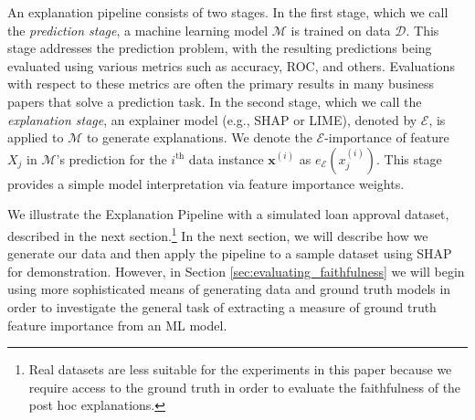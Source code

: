 \documentclass[mnsc,blindrev]{informs3}
\begin{document}
An explanation pipeline consists of two stages. In the first stage, which we call the \emph{prediction stage}, a machine learning model $\mathcal{M}$ is trained on data $\mathcal{D}$. This stage addresses the prediction problem, with the resulting predictions being evaluated using various metrics such as accuracy, ROC, and others. Evaluations with respect to these metrics are often the primary results in many business papers that solve a prediction task. In the second stage, which we call the \emph{explanation stage}, an explainer model (e.g., SHAP or LIME), denoted by $\mathcal{E}$, is applied to $\mathcal{M}$ to generate explanations. We denote the $\mathcal{E}$-importance of feature $X_j$ in $\mathcal{M}$'s prediction for the $i^{\text{th}}$ data instance $\mathbf{x}^{(i)}$ as $e_{\mathcal{E}}(x^{(i)}_j)$. This stage provides a simple model interpretation via feature importance weights. %
    
    We illustrate the Explanation Pipeline with a simulated loan approval dataset, described in the next section.\footnote{Real datasets are less suitable for the experiments in this paper because we require access to the ground truth in order to evaluate the faithfulness of the post hoc explanations.} %
    In the next section, we will describe how we generate our data and then apply the pipeline to a sample dataset using SHAP for demonstration. %
    However, in Section \ref{sec:evaluating_faithfulness} we will begin using more sophisticated means of generating data and ground truth models in order to investigate the general task of extracting a measure of ground truth feature importance from an ML model.
\end{document}
